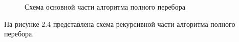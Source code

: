 \documentclass[a4paper,12pt]{report}
\begin{document}
\begin{figure}[ht!]
\caption{Схема основной части алгоритма полного перебора}
\end{figure}

\newpage

На рисунке 2.4 представлена схема рекурсивной части алгоритма полного перебора.
\end{document}
